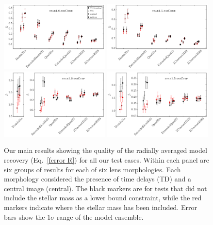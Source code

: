\documentclass[galley,usenatbib]{mn2e}
\newcommand{\eqnrefp}[1] {(Eq.~\ref{#1})}
\begin{document}
\begin{figure}
\includegraphics[width=0.49\textwidth]{AAferror_profile-1sig.pdf}
\includegraphics[width=0.49\textwidth]{BBferror_profile-1sig.pdf}\\
\includegraphics[width=0.49\textwidth]{ACferror_profile-1sig.pdf}
\includegraphics[width=0.49\textwidth]{BCferror_profile-1sig.pdf}
\caption{Our main results showing the quality of the radially averaged model recovery \eqnrefp{ferror R} for all our test cases. 
Within each panel are six groups of results for each of six lens morphologies. Each morphology
considered the presence of time delays (TD) and a central image (central). The black markers are for tests
that did not include the stellar mass as a lower bound constraint, while the red markers
indicate where the stellar mass has been included. Error bars show the $1\sigma$ range of the model ensemble.}
\label{main results}
\end{figure}
\end{document}
